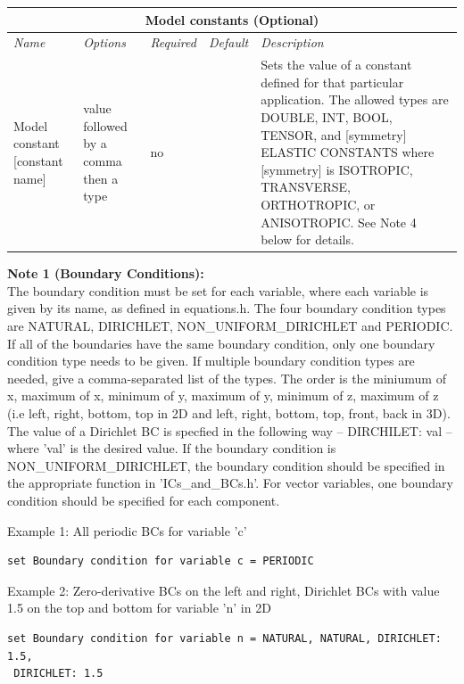 \documentclass[10pt]{article} %
\begin{document}
\begin{center}
    \begin{tabular}{ | p{} | p{} | p{} | p{} | p{} |}
    \hline
      \multicolumn{5}{|c|}{\textbf{Model constants (Optional)}} \\
    \hline
    \hline
    \emph{Name} & \emph{Options} & \emph{Required} & \emph{Default} & \emph{Description} \\ \hline
    Model constant [constant name] & value followed by a comma then a type & no &  & Sets the value of a constant defined for that particular application. The allowed types are DOUBLE, INT, BOOL, TENSOR, and [symmetry] ELASTIC CONSTANTS where [symmetry] is ISOTROPIC, TRANSVERSE, ORTHOTROPIC, or ANISOTROPIC. See Note 4 below for details. \\ \hline
    \end{tabular}
\end{center}

\normalsize

\textbf{Note 1 (Boundary Conditions):} \\
The boundary condition must be set for each variable, where each variable is given by its name, as defined in equations.h. The four boundary condition types are NATURAL, DIRICHLET, NON\_UNIFORM\_DIRICHLET and PERIODIC. If all of the boundaries have the same boundary condition, only one boundary condition type needs to be given. If multiple boundary condition types are needed, give a comma-separated list of the types. The order is the miniumum of x, maximum of x, minimum of y, maximum of y, minimum of z, maximum of z (i.e left, right, bottom, top in 2D and left, right, bottom, top, front, back in 3D). The value of a Dirichlet BC is specfied in the following way -- DIRCHILET: val -- where 'val' is the desired value. If the boundary condition is NON\_UNIFORM\_DIRICHLET, the boundary condition should be specified in the appropriate function in 'ICs\_and\_BCs.h'. For vector variables, one boundary condition should be specified for each component.

Example 1: All periodic BCs for variable 'c'
\begin{lstlisting}
set Boundary condition for variable c = PERIODIC
\end{lstlisting}

Example 2: Zero-derivative BCs on the left and right, Dirichlet BCs with value 1.5 on the top and bottom for variable 'n' in 2D
\begin{lstlisting}
set Boundary condition for variable n = NATURAL, NATURAL, DIRICHLET: 1.5,
 DIRICHLET: 1.5
\end{lstlisting}
\end{document}
